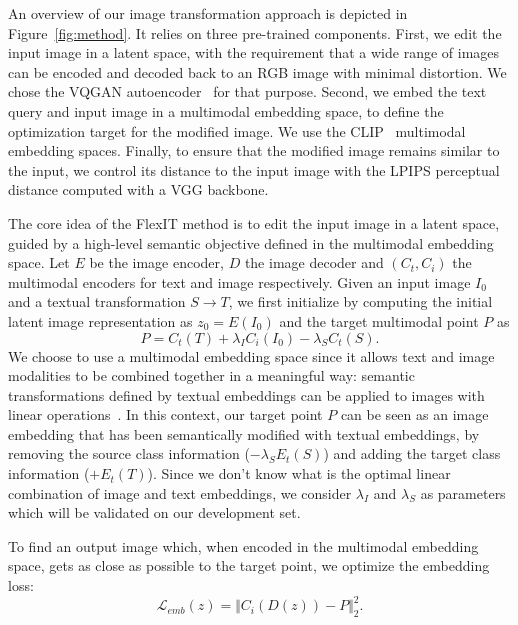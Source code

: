 An overview of our image transformation approach is depicted in Figure~\ref{fig:method}. 
It relies on three pre-trained components. 
First, we edit the input image in a  latent space, with the requirement that a wide 
range of  images can be encoded and decoded back to an RGB image with minimal
 distortion. We chose the VQGAN autoencoder~\cite{esser2021taming} for that purpose.
Second, we embed the text query and input image in a multimodal embedding space, to 
define the optimization target for the modified image. We use the 
CLIP~\cite{radford21clip} multimodal embedding spaces.
Finally, to ensure that the modified image remains similar to the input, we control 
its distance to the input image with the LPIPS perceptual distance \cite{zhang18cvpr}
 computed with a VGG \cite{simonyan15iclr} backbone.


The core idea of the FlexIT method is to edit the input image in a latent space, 
guided by a high-level semantic objective defined in the multimodal embedding space.
 Let $E$ be the image encoder, $D$ the image decoder and $(C_t, C_i)$ the multimodal 
 encoders for text and image respectively. Given an input image $I_0$ and a textual 
 transformation $S \rightarrow T$, we first initialize \ours by computing the initial 
 latent image representation as $z_0 = E(I_0)$ and the target multimodal point $P$ as
\begin{equation} 
P = C_t(T) + \lambda_{I} C_i(I_0) - \lambda_S C_t(S). \label{eq:p}
\end{equation}
We choose to use a multimodal embedding space since it allows text and image modalities 
to be combined together in a meaningful way: semantic transformations defined by textual
 embeddings can be applied to images with linear operations~\cite{jia2021scaling}. In 
 this context, our target point $P$ can be seen as an image embedding that has been
  semantically modified with textual embeddings, by removing the source class information ($-\lambda_S E_t(S)$) and adding the target class information ($+E_t(T)$). Since we don't know what is the optimal linear combination of image and text embeddings, we consider $\lambda_I$ and $\lambda_S$ as parameters which will be validated on our development set.

To find an output image which, when encoded in the multimodal embedding space, gets as close as possible to the target point, we optimize the embedding loss: 
\begin{equation}
    \mathcal{L}_{emb}(z) = \Vert C_i(D(z)) - P \Vert_2^2.
\end{equation}


